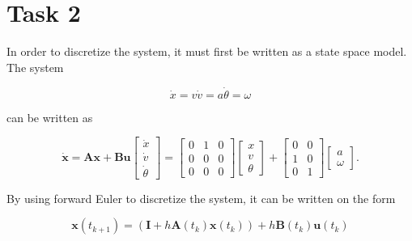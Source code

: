 \documentclass{article}
\begin{document}
\section*{Task 2}
In order to discretize the system, it must first be written as a state space model. The system

\begin{subequations}
\begin{equation}
	\dot{x} = v 
\end{equation}
\begin{equation}
	\dot{v} = a
\end{equation}
\begin{equation}
	\dot{\theta} = \omega
\end{equation}
\end{subequations}

can be written as

\begin{subequations}
\begin{equation}
	\dot{\bm{x}} = \bm{A}\bm{x} + \bm{B}\bm{u}
\end{equation}
\begin{equation}
	\begin{bmatrix}
		\dot{x} \\ \dot{v} \\ \dot{\theta}
	\end{bmatrix}
	=
	\begin{bmatrix}
		0 & 1 & 0 \\
		0 & 0 & 0 \\
		0 & 0 & 0
	\end{bmatrix}
	\begin{bmatrix}
		x \\ v \\ \theta
	\end{bmatrix}
	+
	\begin{bmatrix}
		0 & 0 \\
		1 & 0 \\
		0 & 1
	\end{bmatrix}
	\begin{bmatrix}
		a \\ \omega
	\end{bmatrix}
	.
\end{equation}
\end{subequations}

By using forward Euler to discretize the system, it can be written on the form

\begin{equation}
	\bm{x}(t_{k+1}) = (\bm{I} + h\bm{A}(t_k)\bm{x}(t_k)) + h\bm{B}(t_k)\bm{u}(t_k)
\end{equation}
\end{document}

